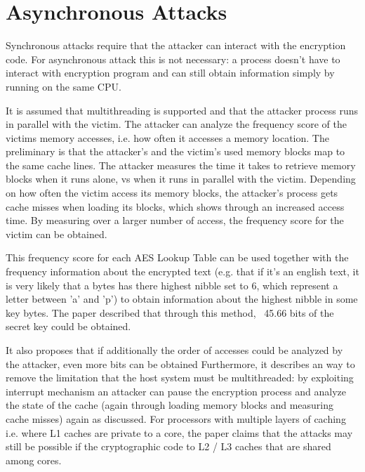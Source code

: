 \section{Asynchronous Attacks}
Synchronous attacks require that the attacker can interact with the encryption code.
For asynchronous attack this is not necessary: a process doesn't have to interact with encryption program and can still obtain information simply by running on the same CPU.

It is assumed that multithreading is supported and that the attacker process runs in parallel with the victim.
The attacker can analyze the frequency score of the victims memory accesses, i.e. how often it accesses a memory location.
The preliminary is that the attacker's and the victim's used memory blocks map to the same cache lines.
The attacker measures the time it takes to retrieve memory blocks when it runs alone, vs when it runs in parallel with the victim.
Depending on how often the victim access its memory blocks, the attacker's process gets cache misses when loading its blocks, which shows through an increased access time.
By measuring over a larger number of access, the frequency score for the victim can be obtained.

This frequency score for each AES Lookup Table can be used together with the frequency information about the encrypted text (e.g. that if it's an english text, it is very likely that a bytes has there highest nibble set to 6, which represent a letter between 'a' and 'p') to obtain information about the highest nibble in some key bytes.
The paper described that through this method, ~45.66 bits of the secret key could be obtained.

It also proposes that if additionally the order of accesses could be analyzed by the attacker, even more bits can be obtained
Furthermore, it describes an way to remove the limitation that the host system must be multithreaded: by exploiting interrupt mechanism an attacker can pause the encryption process and analyze the state of the cache (again through loading memory blocks and measuring cache misses) again as discussed.
For processors with multiple layers of caching i.e. where L1 caches are private to a core, the paper claims that the attacks may still be possible if the cryptographic code to L2 / L3 caches that are shared among cores.

